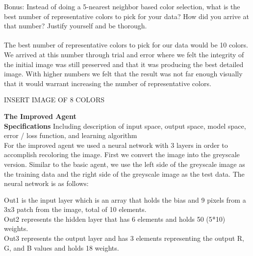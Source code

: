 \documentclass{article}
\theoremstyle{definition}
\begin{document}
 Bonus: Instead of doing a 5-nearest neighbor based color selection, what is the best number of representative colors to pick for your data? How did you arrive at that number? Justify yourself and be thorough. \\\\
 The best number of representative colors to pick for our data would be 10 colors. We arrived at this number through trial and error where we felt the integrity of the initial image was still preserved and that it was producing the best detailed image. With higher numbers we felt that the result was not far enough visually that it would warrant increasing the number of representative colors. 
 
 INSERT IMAGE OF 8 COLORS

\textbf{\Large The Improved Agent} \\

	\textbf{Specifications}
	    Including description of input space, output space, model space, error / loss function, and learning algorithm \\
        For the improved agent we used a neural network with 3 layers in order to accomplish recoloring the image. First we convert the image into the greyscale version. Similar to the basic agent, we use the left side of the greyscale image as the training data and the right side of the greyscale image as the test data.
        The neural network is as follows: \\

        \begin{figure}[H]
            \centering
        \end{figure}
                
        Out1 is the input layer which is an array that holds the bias and 9 pixels from a 3x3 patch from the image, total of 10 elements. \\
        Out2 represents the hidden layer that has 6 elements and holds 50 (5*10) weights. \\
        Out3 represents the output layer and has 3 elements representing the output R, G, and B values and holds 18 weights. \\
        
\end{document}
